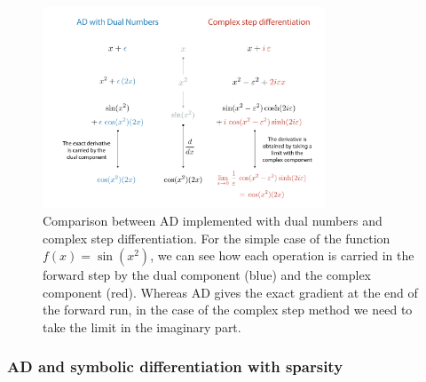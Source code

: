 \begin{figure}[t]
    \centering
    \includegraphics[width=0.75\textwidth]{figures/complex-step-AD.pdf}
    \caption{Comparison between AD implemented with dual numbers and complex step differentiation. For the simple case of the function $f(x) = \sin(x^2)$, we can see how each operation is carried in the forward step by the dual component (blue) and the complex component (red). Whereas AD gives the exact gradient at the end of the forward run, in the case of the complex step method we need to take the limit in the imaginary part. }
    \label{fig:complex-step-AD}
\end{figure}

\subsubsection{AD and symbolic differentiation with sparsity}

